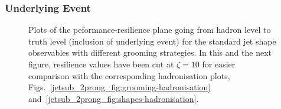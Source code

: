 \documentclass[11pt]{cernrep}
\begin{document}
\subsubsection{Underlying Event}\label{jetsub_2prong_sec:UE}


\begin{figure}
  \caption{Plots of the peformance-resilience plane going from hadron
    level to truth level (inclusion of underlying event) for the
    standard jet shape observables with different grooming strategies.
    In this and the next figure, resilience values have been cut at
    $\zeta=10$ for easier comparison with the corresponding
    hadronisation plots,
    Figs.~\ref{jetsub_2prong_fig:grooming-hadronisation}
    and~\ref{jetsub_2prong_fig:shapes-hadronisation}.}\label{jetsub_2prong_fig:grooming-UE}
\end{figure}
\end{document}
